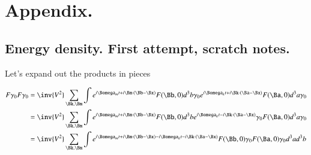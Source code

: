 \documentclass{article}
\title{}
\author{Peeter Joot \quad peeter.joot@gmail.com}
\date{ Feb dd, 2009.  Last Revision: $Date: 2009/06/04 00:44:05 $ }
\begin{document}
\maketitle{}

\tableofcontents

\section{}

%


\section{Appendix. }
\subsection{Energy density.  First attempt, scratch notes. }

Let's expand out the products in pieces

\begin{align*}
F \gamma_0 F \gamma_0
&=
\inv{V^2} \sum_{\Bk,\Bm}
\int e^{i \Bomega_m t + i \Bm \cdot (\Bb-\Bx) } F(\Bb, 0) d^3 b \gamma_0
e^{i \Bomega_k t + i \Bk \cdot (\Ba-\Bx) } F(\Ba, 0) d^3 a \gamma_0 \\
&=
\inv{V^2} \sum_{\Bk,\Bm}
\int e^{i \Bomega_m t + i \Bm \cdot (\Bb-\Bx) } F(\Bb, 0) d^3 b
e^{i \Bomega_k t - i \Bk \cdot (\Ba-\Bx) } \gamma_0 F(\Ba, 0) d^3 a \gamma_0 \\
&=
\inv{V^2} \sum_{\Bk,\Bm}
\int e^{i \Bomega_m t + i \Bm \cdot (\Bb-\Bx) -i \Bomega_k t - i \Bk \cdot (\Ba-\Bx) } F(\Bb, 0) \gamma_0 F(\Ba, 0) \gamma_0 d^3 a d^3 b \\
\end{align*}
\end{document}
